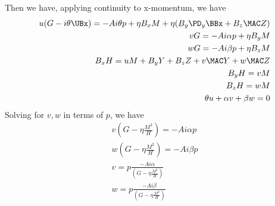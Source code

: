 \documentclass[11pt]{article}
\begin{document}
Then we have, applying continuity to x-momentum, we have
\begin{equation}\begin{aligned}
u (G - i \theta \UBx) = -A i \theta p + \eta B_x M + \eta (B_y \PD_y \BBx + B_z \MAC Z) \\
v G                   = -A i \alpha p + \eta B_y M \\
w G                   = -A i \beta  p + \eta B_z M \\
B_x H = u M +B_y Y +B_z Z + v \MAC Y +w \MAC Z \\
B_y H = v M \\
B_z H = w M \\
\theta u +  \alpha v +  \beta w = 0 \\
\end{aligned} \end{equation}
Solving for $v,w$ in terms of $p$, we have
\begin{equation}\begin{aligned}
v (G-\eta \frac{M^2}{H}) = -A i \alpha p \\
w (G-\eta \frac{M^2}{H}) = -A i \beta  p \\
v = p \frac{-A i \alpha }{(G-\eta \frac{M^2}{H})} \\
w = p \frac{-A i \beta  }{(G-\eta \frac{M^2}{H})} \\
\end{aligned} \end{equation}
\end{document}
